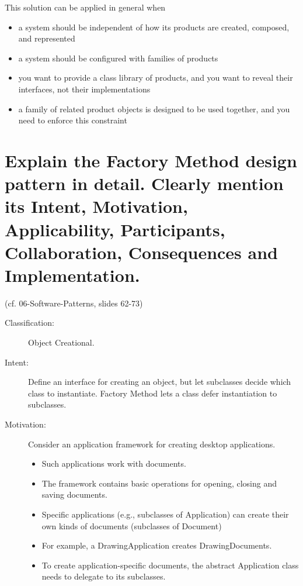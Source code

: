 This solution can be applied in general when

\begin{itemize}
\item a system should be independent of how its products are created, composed, and represented
\item a system should be configured with families of products
\item you want to provide a class library of products, and you want to reveal their interfaces, not their implementations
\item a family of related product objects is designed to be used together, and you need to enforce this constraint
\end{itemize}

\section{Explain the Factory Method design pattern in detail.
Clearly mention its Intent, Motivation, Applicability, Participants, Collaboration,
Consequences and Implementation.}

(cf. 06-Software-Patterns, slides 62-73)

\begin{description}
\item[Classification:] Object Creational.

\item[Intent:] Define an interface for creating an object, but let subclasses decide which class to instantiate. Factory Method lets a class defer instantiation to subclasses.

\item[Motivation:] Consider an application framework for creating desktop applications.
\begin{itemize}
\item Such applications work with documents.
\item The framework contains basic operations for opening, closing and saving documents.
\item Specific applications (e.g., subclasses of Application) can create their own kinds of documents (subclasses of Document)
\item For example, a DrawingApplication creates DrawingDocuments.
\item To create application-specific documents, the abstract Application class needs to delegate to its subclasses.
\end{itemize}
\end{description}


